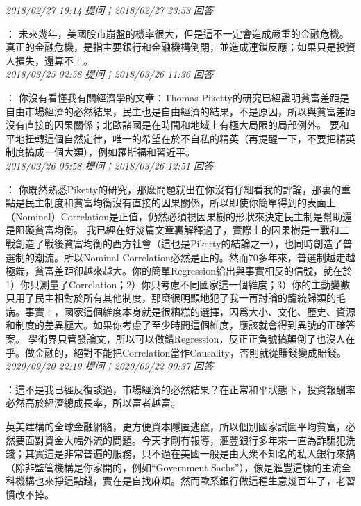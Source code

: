 \documentclass[twocolumn]{ctexart}
\begin{document}
\textit{\hfill\noindent\small 2018/02/27 19:14 提问；2018/02/27 23:53 回答}

：
未來幾年，美國股市崩盤的機率很大，但是這不一定會造成嚴重的金融危機。
真正的金融危機，是指主要銀行和金融機構倒閉，並造成連鎖反應；如果只是投資人損失，還算不上。
\\

\textit{\hfill\noindent\small 2018/03/25 02:58 提问；2018/03/26 11:36 回答}

：
你沒有看懂我有關經濟學的文章：Thomas Piketty的研究已經證明貧富差距是自由市場經濟的必然結果，民主也是自由經濟的結果，不是原因，所以與貧富差距沒有直接的因果關係；北歐諸國是在時間和地域上有極大局限的局部例外。 
要和平地扭轉這個自然定律，唯一的希望在於不自私的精英（再提醒一下，不要把精英制度搞成一個大類），例如羅斯福和習近平。
\\

\textit{\hfill\noindent\small 2018/03/26 05:58 提问；2018/03/26 12:51 回答}

：
你既然熟悉Piketty的研究，那麽問題就出在你沒有仔細看我的評論，那裏的重點是民主制度和貧富均衡沒有直接的因果關係，所以即使你簡單得到的表面上（Nominal）Correlation是正值，仍然必須視因果樹的形狀來決定民主制是幫助還是阻礙貧富均衡。 
我已經在好幾篇文章裏解釋過了，實際上的因果樹是一戰和二戰創造了戰後貧富均衡的西方社會（這也是Piketty的結論之一），也同時創造了普選制的潮流。所以Nominal Correlation必然是正的。然而70多年來，普選制越走越極端，貧富差距卻越來越大。你的簡單Regression給出與事實相反的信號，就在於1）你只測量了Correlation；2）你只考慮不同國家這一個維度；3）你的主動變數只用了民主相對於所有其他制度，那麽很明顯地犯了我一再討論的籠統歸類的毛病。事實上，國家這個維度本身就是很糟糕的選擇，因爲大小、文化、歷史、資源和制度的差異極大。如果你考慮了至少時間這個維度，應該就會得到異號的正確答案。 
學術界只管發論文，所以可以做錯Regression，反正正負號搞顛倒了也沒人在乎。做金融的，絕對不能把Correlation當作Causality，否則就從賺錢變成賠錢。
\\

\textit{\hfill\noindent\small 2020/09/20 22:19 提问；2020/09/22 00:37 回答}

：這不是我已經反復談過，市場經濟的必然結果？在正常和平狀態下，投資報酬率必然高於經濟總成長率，所以富者越富。

英美建構的全球金融網絡，更方便資本隱匿逃竄，所以個別國家試圖平均貧富，必然要面對資金大幅外流的問題。今天才剛有報導，滙豐銀行多年來一直為詐騙犯洗錢；其實這是非常普遍的服務，只不過在美國一般是由大衆不知名的私人銀行來搞（除非監管機構是你家開的，例如“Government Sachs”），像是滙豐這樣的主流全科機構也來掙這點錢，實在是自找麻煩。然而歐系銀行做這種生意幾百年了，老習慣改不掉。
\\
\end{document}
